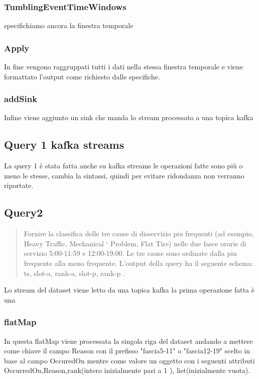 \documentclass[acmsmall]{acmart}
\begin{document}
\subsubsection{TumblingEventTimeWindows}
specifichiamo ancora la finestra temporale

\subsubsection{Apply}
In fine vengono raggruppati tutti i dati nella stessa finestra temporale e viene formattato l'output come richiesto dalle specifiche.
\subsubsection{addSink}
Infine viene aggiunto un sink che manda lo stream processato a una topica kafka

\subsection{Query 1 kafka streams}
La query 1 è stata fatta anche su kafka streams le operazioni fatte sono più o meno le stesse, cambia la sintassi, quindi per evitare ridondanza non verranno riportate.


\subsection{Query2}
\begin{quote}
Fornire la classifica delle tre cause di disservizio piu frequenti (ad esempio, Heavy Traffic, Mechanical `
Problem, Flat Tire) nelle due fasce orarie di servizio 5:00-11:59 e 12:00-19:00. Le tre cause sono ordinate dalla piu frequente alla meno frequente. L’output della query ha il seguente schema:
ts, slot-a, rank-a, slot-p, rank-p .\end{quote}

Lo stream del dataset viene letto da una topica kafka la prima operazione fatta 
è una 

\subsubsection{flatMap}
In questa flatMap viene processata la singola riga del dataset andando a mettere come chiave il campo Reason con il prefisso "fascia5-11" o "fascia12-19" scelto in base al campo OccuredOn mentre come valore un oggetto con i seguenti attributi
OccurredOn,Reason,rank(intero inizialmente pari a 1 ), list(inizialmente vuota).
\end{document}
